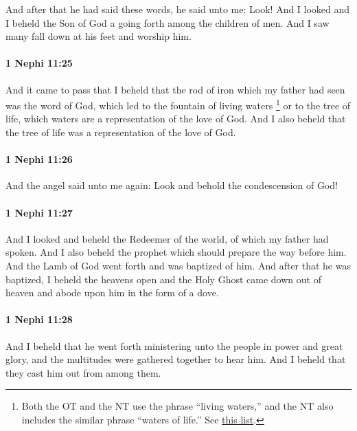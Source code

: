 			And after that he had said these words,
			he said unto me: Look!
			And I looked and I beheld the Son of God
			a going forth among the children of men.
			And I saw many fall down at his feet and worship him.

		\paragraph{1 Nephi 11:25} %
			\label{1NEPHI-11-25}

			And it came to pass that I beheld
			that the rod of iron which my father had seen was the word of God,
			which led to the fountain of living waters%
				\footnote{%
					\label{1NEPHI-11-25-NOTE-waters}%
					Both the OT and the NT use the phrase ``living waters,'' and the NT also includes the similar phrase ``waters of life.'' See \hyperref[WATER-PHRASES]{this list}.
					}
			or to the tree of life,
			which waters are a representation of the love of God.
			And I also beheld that the tree of life was a representation of the love of God.

		\paragraph{1 Nephi 11:26} %
			\label{1NEPHI-11-26}

			And the angel said unto me again:
			Look and behold the condescension of God!

		\paragraph{1 Nephi 11:27} %
			\label{1NEPHI-11-27}

			And I looked and beheld the Redeemer of the world,
			of which my father had spoken.
			And I also beheld the prophet which should prepare the way before him.
			And the Lamb of God went forth and was baptized of him.
			And after that he was baptized,
			I beheld the heavens open
			and the Holy Ghost came down out of heaven
			and abode upon him in the form of a dove.

		\paragraph{1 Nephi 11:28} %
			\label{1NEPHI-11-28}

			And I beheld that he went forth
			ministering unto the people in power and great glory,
			and the multitudes were gathered together to hear him.
			And I beheld that they cast him out from among them.

